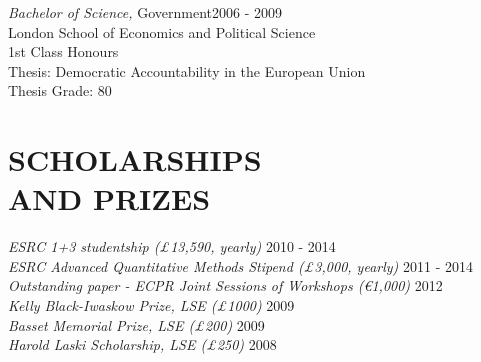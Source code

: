 \documentclass[line,margin]{res}
\begin{document}
\begin{resume}
					{\sl Bachelor of Science,} Government\hfill 2006 - 2009 \\
                London School of Economics and Political Science\\
                1st Class Honours \\
                Thesis: Democratic Accountability in the European Union\\%
				Thesis Grade: 80
			
\section{SCHOLARSHIPS \\ AND PRIZES}  {
{\sl ESRC 1+3 studentship (\pounds 13,590, yearly)} \hfill 2010 - 2014 \\
{\sl ESRC Advanced Quantitative Methods Stipend (\pounds 3,000, yearly)} \hfill 2011 - 2014 \\
{\sl Outstanding paper - ECPR Joint Sessions of Workshops (\euro 1,000)} \hfill 2012 \\
{\sl Kelly Black-Iwaskow Prize, LSE (\pounds 1000)} \hfill 2009 \\
{\sl Basset Memorial Prize, LSE (\pounds 200)} \hfill 2009 \\
\sl Harold Laski Scholarship, LSE (\pounds 250)} \hfill 2008 \\







\end{resume}
\end{document}
